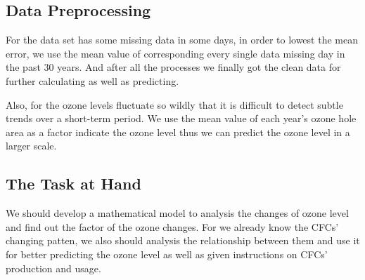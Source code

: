 \documentclass[12pt]{article}
\begin{document}
\subsection{Data Preprocessing}
For the data set has some missing data in some days, in order to lowest the mean error, we use the mean value of corresponding  every single data missing day in the past 30 years. And after all the processes we finally got the clean data for further calculating as well as predicting. 

Also, for the ozone levels fluctuate so wildly that it is difficult to detect subtle trends over a short-term period. We use the mean value of each year's ozone hole area as a factor indicate the ozone level thus we can predict the ozone level  in a larger scale.
\subsection{The Task at Hand}
We should develop a mathematical model to analysis the changes of ozone level and find out the factor of the ozone changes.  For we already know the CFCs' changing patten, we also should analysis the relationship between them and use it for better predicting the ozone level as well as given instructions on CFCs' production and usage.\cite{theozonehole.com}
\end{document}
